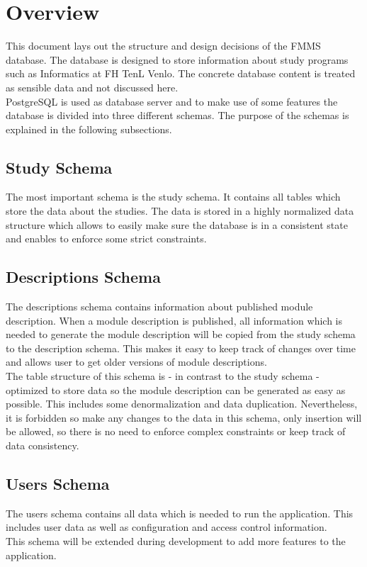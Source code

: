 \section{Overview}
\label{sec:intro}

This document lays out the structure and design decisions of the FMMS database.
The database is designed to store information about study programs such as Informatics at FH TenL Venlo.
The concrete database content is treated as sensible data and not discussed here.
~\\
PostgreSQL is used as database server and to make use of some features the database is divided into three different schemas. The purpose of the schemas is explained in the following subsections.


\subsection{Study Schema}
The most important schema is the \glqq study\grqq{} schema. It contains all tables which store the data about the studies. The data is stored in a highly normalized data structure which allows to easily make sure the database is in a consistent state and enables to enforce some strict constraints.


\subsection{Descriptions Schema}
The descriptions schema contains information about published module description.
When a module description is published, all information which is needed to generate the module description will be copied from the study schema to the description schema.
This makes it easy to keep track of changes over time and allows user to get older versions of module descriptions.
~\\
The table structure of this schema is - in contrast to the study schema - optimized to store data so the module description can be generated as easy as possible. This includes some denormalization and data duplication.
Nevertheless, it is forbidden so make any changes to the data in this schema, only insertion will be allowed, so there is no need to enforce complex constraints or keep track of data consistency.


\subsection{Users Schema}
The users schema contains all data which is needed to run the application. This includes user data as well as configuration and access control information.
~\\
This schema will be extended during development to add more features to the application.
